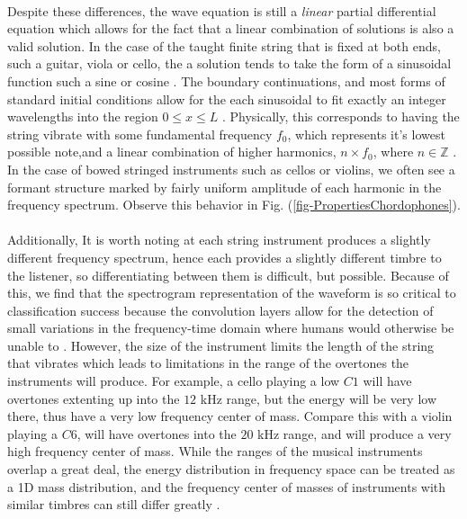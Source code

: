 \documentclass[12pt,letterpaper]{article}
\begin{document}
\paragraph*{}Despite these differences, the wave equation is still a \textit{linear} partial differential equation which allows for the fact that a linear combination of solutions is also a valid solution. In the case of the taught finite string that is fixed at both ends, such a guitar, viola or cello, the a solution tends to take the form of a sinusoidal function such a sine or cosine \cite{Hunter, Taylor, White}. The boundary continuations, and most forms of standard initial conditions allow for the each sinusoidal to fit exactly an integer wavelengths into the region $0 \leq x \leq L$ \cite{Haberman,Hunter}. Physically, this corresponds to having the string vibrate with some fundamental frequency $f_0$, which represents it's lowest possible note,and a linear combination of higher harmonics, $n \times f_0$, where $n \in \mathbb{Z}$ \cite{Olson,Taylor,White}. In the case of bowed stringed instruments such as cellos or violins, we often see a formant structure marked by fairly uniform amplitude of each harmonic in the frequency spectrum. Observe this behavior in Fig. (\ref{fig-PropertiesChordophones}).

\paragraph*{}Additionally, It is worth noting at each string instrument produces a slightly different frequency spectrum, hence each provides a slightly different timbre to the listener, so differentiating between them is difficult, but possible. Because of this, we find that the spectrogram representation of the waveform is so critical to classification success because the convolution layers allow for the detection of small variations in the frequency-time domain where humans would otherwise be unable to \cite{Loy,Virtanen}. However, the size of the instrument limits the length of the string that vibrates which leads to limitations in the range of the overtones the instruments will produce. For example, a cello playing a low $C1$ will have overtones extenting up into the $12$ kHz range, but the energy will be very low there, thus have a very low frequency center of mass. Compare this with a violin playing a $C6$, will have overtones into the $20$ kHz range, and will produce a very high frequency center of mass. While the ranges of the musical instruments overlap a great deal, the energy distribution in frequency space can be treated as a 1D mass distribution, and the frequency center of masses of instruments with similar timbres can still differ greatly \cite{Serizel}.
\end{document}
